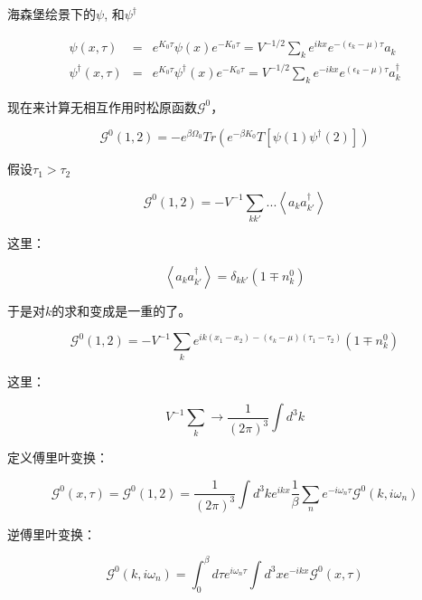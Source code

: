 海森堡绘景下的$\psi$, 和$\psi^\dagger$

\begin{eqnarray*}
\psi(x,\tau) &=& e^{K_0 \tau} \psi(x) e^{-K_0 \tau} = V^{-1/2} \sum\limits_k e^{ikx} e^{ -(\epsilon_k - \mu)\tau } a_k\\
\psi^\dagger (x,\tau) &=& e^{K_0 \tau} \psi^\dagger (x) e^{-K_0 \tau} = V^{-1/2} \sum\limits_k e^{- ikx} e^{ (\epsilon_k - \mu)\tau } a^\dagger_k
\end{eqnarray*}

现在来计算无相互作用时松原函数$\mathcal{G}^0$，

\begin{equation}
\mathcal{G}^0(1,2)=- e^{\beta \Omega_0} Tr \left( e^{-\beta K_0} T [ \psi(1) \psi^\dagger (2) ] \right)
\end{equation}

假设$\tau_1 > \tau_2$

\begin{equation*}
\mathcal{G}^0(1,2) = - V^{-1} \sum\limits_{k k'} ... \left\langle a_k a^\dagger_{k'}  \right\rangle
\end{equation*}

这里：

\begin{equation}
\left\langle a_k a^\dagger_{k'}  \right\rangle = \delta_{kk'} (1 \mp n_k^0)
\end{equation}

于是对$k$的求和变成是一重的了。

\begin{equation}
\mathcal{G}^0 (1,2) = - V^{-1} \sum\limits_k e^{i k (x_1 - x_2) - (\epsilon_k - \mu) (\tau_1 - \tau_2) }  (1 \mp n_k^0)
\end{equation}

这里：

\begin{equation*}
V^{-1} \sum\limits_k \to \frac{1}{(2 \pi)^3} \int d^3 k
\end{equation*}

定义傅里叶变换：

\begin{equation}
\mathcal{G}^0 (x, \tau) = \mathcal{G}^0 (1,2) = \frac{1}{(2\pi)^3} \int d^3 k  e^{i k x} \frac{1}{\beta} \sum\limits_n e^{-i \omega_n \tau} \mathcal{G}^0 (k, i\omega_n)
\end{equation}

逆傅里叶变换：

\begin{equation}
\mathcal{G}^0 (k, i\omega_n) = \int_0^\beta d \tau e^{i \omega_n \tau} \int d^3 x e^{-i k x} \mathcal{G}^0 (x, \tau) 
\end{equation}

